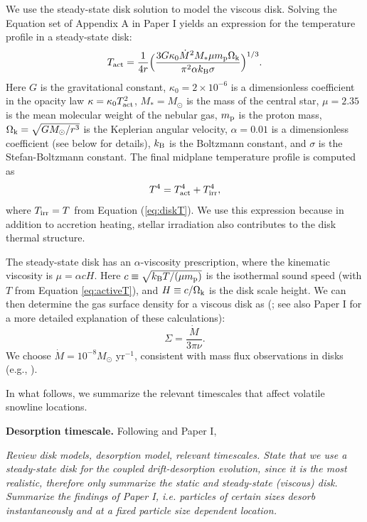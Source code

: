 \documentclass[apj]{emulateapj}
\newcommand{\emgr}[1]{\emph{ \color{gray} #1}}
\begin{document}
We use the \citet{shakura73}  steady-state disk solution to model the viscous disk. Solving the Equation set of Appendix A in Paper I yields an expression for the temperature profile in a steady-state disk:
\begin{equation}
\label{eq:Tdact}
T_{\rm act}=\frac{1}{4 r} \Big(\frac{3 G \kappa_0\dot{M}^2 M_* \mu m_{\rm p} \Omega_{\rm k}}{\pi^2 \alpha k_{\rm B} \sigma}\Big)^{1/3}.
\end{equation}
Here $G$ is the gravitational constant, $\kappa_0=2 \times 10^{-6}$ is a dimensionless coefficient in the opacity law $\kappa=\kappa_0 T_{\rm act}^2$, $M_*=M_{\odot}$ is the mass of the central star, $\mu=2.35$ is the mean molecular weight of the nebular gas, $m_{\rm p}$ is the proton mass, $\Omega_{\rm k}=\sqrt{G M_{\odot}/r^3}$ is the Keplerian angular velocity, $\alpha=0.01$ is a dimensionless coefficient (see below for details), $k_{\rm B}$ is the Boltzmann constant, and $\sigma$ is the Stefan-Boltzmann constant. The final midplane temperature profile is computed as 
\begin{equation}
\label{eq:activeT}
T^4 = T_{\rm act}^4 + T_{\rm irr}^4,
\end{equation}
where $T_{\rm irr}=T$ from Equation (\ref{eq:diskT}). We use this expression because in addition to accretion heating, stellar irradiation also contributes to the disk thermal structure. 

The steady-state disk has an $\alpha$-viscosity prescription, where the kinematic viscosity is $\mu=\alpha c H$. Here $c \equiv \sqrt{k_{\rm B} T /(\mu m_{\rm p})}$ is the isothermal sound speed (with $T$ from Equation \ref{eq:activeT}), and $H \equiv c/\Omega_{\rm k}$ is the disk scale height. We can then determine the gas surface density for a viscous disk as (\citealt{shakura73}; see also Paper I for a more detailed explanation of these calculations):
\begin{equation}
\label{eq:Sigmaact}
\Sigma=\frac{\dot{M}}{3 \pi \nu}.
\end{equation}
We choose $\dot{M}=10^{-8} M_{\odot}$ yr$^{-1}$, consistent with mass flux observations in disks (e.g., \citealt{andrews10}). 

In what follows, we summarize the relevant timescales that affect volatile snowline locations. 

\textbf{Desorption timescale.} Following \citet{hollenbach09} and Paper I, 



\emgr{Review disk models, desorption model, relevant timescales. State that we use a steady-state disk for the coupled drift-desorption evolution, since it is the most realistic, therefore only summarize the static and steady-state (viscous) disk. Summarize the findings of Paper I, i.e. particles of certain sizes desorb instantaneously and at a fixed particle size dependent location.}
\end{document}

